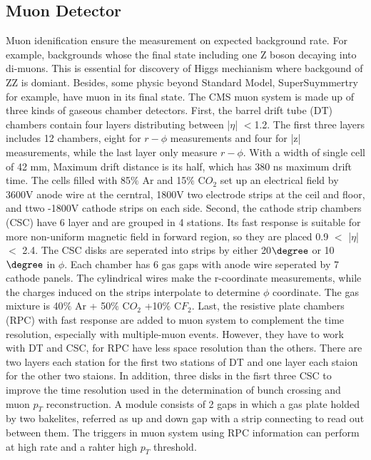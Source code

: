 \subsection{Muon Detector} 
Muon idenification ensure the measurement on expected background rate. 
For example, backgrounds whose the final state including one Z boson decaying into di-muons. 
This is essential for discovery of Higgs mechianism where backgound of ZZ is domiant.
Besides, some physic beyond Standard Model, SuperSuymmertry for example, have muon in its final state.
The CMS muon system is made up of three kinds of gaseous chamber detectors. 
First, the barrel drift tube (DT) chambers contain four layers distributing between |$\eta $| $<$1.2.
The first three layers includes 12 chambers, eight for $r-\phi$ measurements and four for |z| measurements, while the last layer only measure $r-\phi$. 
With a width of single cell of 42 mm, Maximum drift distance is its half, which has 380 ns maximum drift time. 
The cells filled with 85$\% $ Ar and 15$\% $ C$O_2$ set up an electrical field by 3600V anode wire at the cerntral, 1800V two electrode strips at the ceil and floor, and ttwo -1800V cathode strips on each side. 
Second, the cathode strip chambers (CSC) have 6 layer and are grouped in 4 stations.
Its fast response is suitable for more non-uniform magnetic field in forward region, so they are placed 0.9 $<$ |$\eta $| $<$ 2.4.
The CSC disks are seperated into strips by either 20$\degree $ or 10$\degree $ in $\phi $. 
Each chamber has 6 gas gaps with anode wire seperated by 7 cathode panels. 
The cylindrical wires make the r-coordinate measurements, while the charges induced on the strips interpolate to determine $\phi $ coordinate.
The gas mixture is 40$\% $ Ar + 50$\% $ C$O_2$ +10$\% $ C$F_2$. 
Last, the resistive plate chambers (RPC) with fast response are added to muon system to complement the time resolution, especially with multiple-muon events.
However, they have to work with DT and CSC, for RPC have less space resolution than the others.
There are two layers each station for the first two stations of DT and one layer each staion for the other two staions. 
In addition, three disks in the fisrt three CSC to improve the time resolution used in the determination of bunch crossing and muon $p_T$ reconstruction.
A module consists of 2 gaps in which a gas plate holded by two bakelites, referred as up and down gap with a strip connecting to read out between them.
The triggers in muon system using RPC information can perform at high rate and a rahter high $p_{T}$ threshold.

